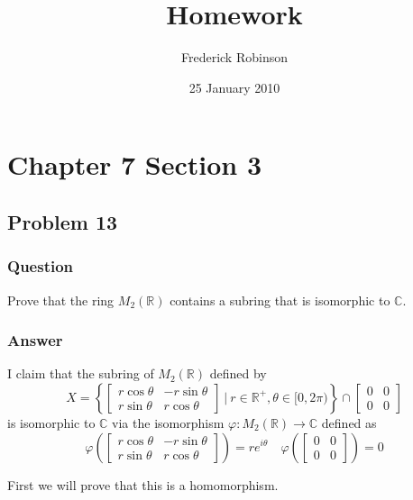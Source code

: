 \documentclass[12pt]{article}
\title{Homework}
\author{Frederick Robinson}
\date{25 January 2010}
\begin{document}

   \maketitle

\setcounter{tocdepth}{2} 

\tableofcontents

\section{Chapter 7 Section 3}
\subsection{Problem 13}

\subsubsection{Question}
Prove that the ring $M_2(\mathbb{R})$ contains a subring that is isomorphic to $\mathbb{C}$.
\subsubsection{Answer}
I claim that the subring of  $M_2(\mathbb{R})$ defined by 
\[X = \left\{ \left[ \begin{array}{lr} r \cos{\theta} & - r \sin{\theta} \\ r \sin{\theta} & r \cos{\theta} \end{array} \right] \ |\ r \in \mathbb{R}^+, \theta \in [0, 2 \pi) \right\} \cap \left[ \begin{array}{lr} 0 &0 \\ 0&0 \end{array} \right] \]
is isomorphic to $\mathbb{C}$ via the isomorphism $\varphi: M_2(\mathbb{R}) \to \mathbb{C}$ defined as
\[ \varphi \left( \left[ \begin{array}{lr} r \cos{\theta} & - r \sin{\theta} \\ r \sin{\theta} & r \cos{\theta} \end{array} \right]  \right)  = r e^{i \theta} \quad \varphi \left(  \left[ \begin{array}{lr} 0 &0 \\ 0&0 \end{array} \right]   \right)  = 0  \]

First we will prove that this is a homomorphism. 
\end{document}

